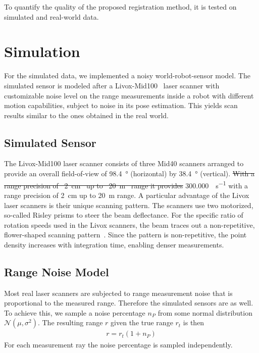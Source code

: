 \documentclass[5p]{elsarticle}
\providecommand{\DIFaddtex}[1]{{\protect\color{blue}\uwave{#1}}} %
\providecommand{\DIFdeltex}[1]{{\protect\color{red}\sout{#1}}}                      %
\providecommand{\DIFaddbegin}{} %
\providecommand{\DIFaddend}{} %
\providecommand{\DIFdelbegin}{} %
\providecommand{\DIFdelend}{} %
\providecommand{\DIFadd}[1]{\texorpdfstring{\DIFaddtex{#1}}{#1}} %
\providecommand{\DIFdel}[1]{\texorpdfstring{\DIFdeltex{#1}}{}} %
\begin{document}
To quantify the quality of the proposed registration method, it is tested on simulated and real-world data. 

\section{Simulation}

For the simulated data, we implemented a noisy world-robot-sensor model.  
The simulated sensor is modeled after a Livox-Mid100~\cite{LivoxMid40-100} laser scanner with customizable noise level on the range measurements inside a robot with different motion capabilities, subject to noise in its pose estimation. 
This yields scan results similar to the ones obtained in the real world.

\subsection{Simulated Sensor}

The Livox-Mid100 laser scanner consists of three Mid40 scanners arranged to provide an overall field-of-view of \SI{98.4}{\degree} (horizontal) by \SI{38.4}{\degree} (vertical).
\DIFdelbegin \DIFdel{With a range precision of \mbox{%
\SI{2}{\centi\meter} }\hspace{0pt}%
up to \mbox{%
\SI{20}{\meter} }\hspace{0pt}%
range it provides }\DIFdelend \DIFaddbegin \DIFadd{It provides a rate of }\DIFaddend \SI[per-mode=symbol]{300,000}{\pts\per\second} with a range precision of \SI{2}{\centi\meter} up to \SI{20}{\meter} range\DIFaddbegin \DIFadd{~\mbox{%
\cite{LivoxMid40-100}}\hspace{0pt}%
}\DIFaddend .
A particular advantage of the Livox laser scanners is their unique scanning pattern.
The scanners use two motorized, so-called Risley prisms to steer the beam deflectance.
For the specific ratio of rotation speeds used in the Livox scanners, the beam traces out a non-repetitive, flower-shaped scanning pattern~\cite{thorlabs}.
Since the pattern is non-repetitive, the point density increases with integration time, enabling denser measurements.

\subsection{Range Noise Model}

Most real laser scanners are subjected to range measurement noise that is proportional to the measured range. 
Therefore the simulated sensors are as well. 
To achieve this, we sample a noise percentage $n_P$ from some normal distribution $\mathcal{N}(\mu,\sigma^2)$. 
The resulting range $r$ given the true range $r_t$ is then
\begin{align}
	r = r_t(1+n_P)
\end{align}
For each measurement ray the noise percentage is sampled independently. 
\end{document}

